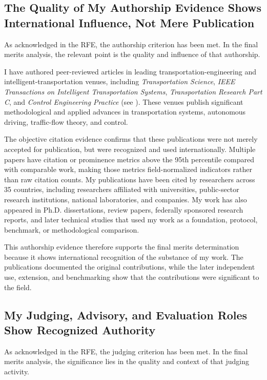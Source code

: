 \documentclass[11pt,letterpaper]{article}
\begin{document}
\subsection{The Quality of My Authorship Evidence Shows International Influence, Not Mere Publication}

As acknowledged in the RFE, the authorship criterion has been met. In the final merits analysis, the relevant point is the quality and influence of that authorship.

I have authored peer-reviewed articles in leading transportation-engineering and intelligent-transportation venues, including \textit{Transportation Science}, \textit{IEEE Transactions on Intelligent Transportation Systems}, \textit{Transportation Research Part C}, and \textit{Control Engineering Practice} (see ). These venues publish significant methodological and applied advances in transportation systems, autonomous driving, traffic-flow theory, and control.

The objective citation evidence confirms that these publications were not merely accepted for publication, but were recognized and used internationally. Multiple papers have citation or prominence metrics above the 95th percentile compared with comparable work, making those metrics field-normalized indicators rather than raw citation counts. My publications have been cited by researchers across 35 countries, including researchers affiliated with universities, public-sector research institutions, national laboratories, and companies. My work has also appeared in Ph.D. dissertations, review papers, federally sponsored research reports, and later technical studies that used my work as a foundation, protocol, benchmark, or methodological comparison.

This authorship evidence therefore supports the final merits determination because it shows international recognition of the substance of my work. The publications documented the original contributions, while the later independent use, extension, and benchmarking show that the contributions were significant to the field.

\subsection{My Judging, Advisory, and Evaluation Roles Show Recognized Authority}

As acknowledged in the RFE, the judging criterion has been met. In the final merits analysis, the significance lies in the quality and context of that judging activity.
\end{document}
